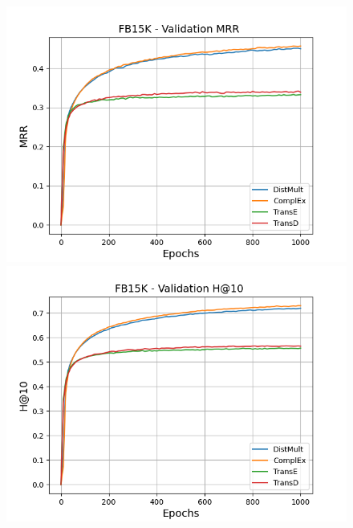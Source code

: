\begin{figure}
    \centering
    \begin{minipage}{.3\textwidth}
      \centering
      \includegraphics[width=\linewidth]{figures/results/pretrain/fb15k/pretrain_fb15k_mrrs.png}
    \end{minipage}%
    \begin{minipage}{.3\textwidth}
      \centering
      \includegraphics[width=\linewidth]{figures/results/pretrain/fb15k/pretrain_fb15k_hit10.png}
    \end{minipage}
    \begin{minipage}{.3\textwidth}
      \centering

\end{minipage}
\end{figure}
